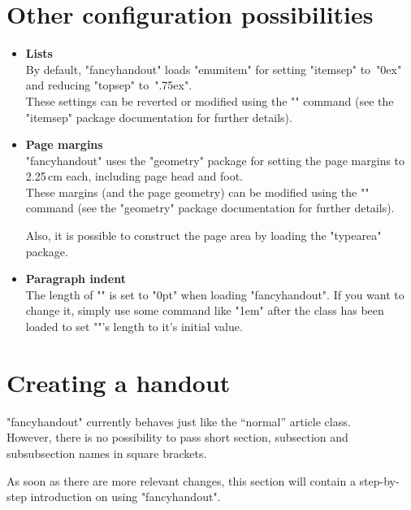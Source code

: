 \documentclass[11pt]{ltxdoc}
\begin{document}
	\section{Other configuration possibilities}
	\begin{itemize}
		\item \textbf{Lists} \\
			By default, "fancyhandout" loads "enumitem" for setting "itemsep" to~"0ex" and reducing "topsep" to~".75ex". \\
			These settings can be reverted or modified using the "\setlist" command (see the "itemsep" package documentation for further details).
		
		\item \textbf{Page margins} \\
			"fancyhandout" uses the "geometry" package for setting the page margins to 2.25\,cm each, including page head and foot. \\
			These margins (and the page geometry) can be modified using the "\geometry" command (see the "geometry" package documentation for further details).
			
			\smallskip
			Also, it is possible to construct the page area by loading the "typearea" package.
		
		\item \textbf{Paragraph indent} \\
			The length of "\parindent" is set to "0pt" when loading "fancyhandout". If you want to change it, simply use some command like "\parindent 1em" after the class has been loaded to set "\parindent"'s length to it's initial value.
	\end{itemize}
	
	
	\section{Creating a handout}
	"fancyhandout" currently behaves just like the \enquote{normal} article class. \\
	However, there is no possibility to pass short section, subsection and subsubsection names in square brackets.
	
	\bigskip
	As soon as there are more relevant changes, this section will contain a step-by-step introduction on using "fancyhandout".
	
	
	\clearpage
\end{document}
